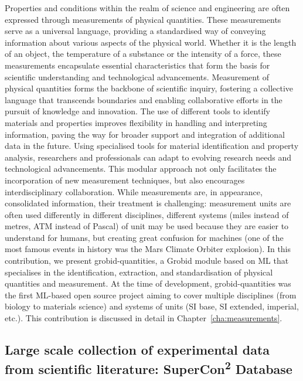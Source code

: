 Properties and conditions within the realm of science and engineering are often expressed through measurements of physical quantities. These measurements serve as a universal language, providing a standardised way of conveying information about various aspects of the physical world. Whether it is the length of an object, the temperature of a substance or the intensity of a force, these measurements encapsulate essential characteristics that form the basis for scientific understanding and technological advancements.
Measurement of physical quantities forms the backbone of scientific inquiry, fostering a collective language that transcends boundaries and enabling collaborative efforts in the pursuit of knowledge and innovation.
The use of different tools to identify materials and properties improves flexibility in handling and interpreting information, paving the way for broader support and integration of additional data in the future. Using specialised tools for material identification and property analysis, researchers and professionals can adapt to evolving research needs and technological advancements. This modular approach not only facilitates the incorporation of new measurement techniques, but also encourages interdisciplinary collaboration.
While measurements are, in appearance, consolidated information, their treatment is challenging: measurement units are often used differently in different disciplines, different systems (miles instead of metres, ATM instead of Pascal) of unit may be used because they are easier to understand for humans, but creating great confusion for machines (one of the most famous events in history was the Mars Climate Orbiter explosion). 
In this contribution, we present grobid-quantities, a Grobid module based on ML that specialises in the identification, extraction, and standardisation of physical quantities and measurement. At the time of development, grobid-quantities was the first ML-based open source project aiming to cover multiple disciplines (from biology to materials science) and systems of units (SI base, SI extended, imperial, etc.). 
This contribution is discussed in detail in Chapter~\ref{cha:measurements}.


\subsection{Large scale collection of experimental data from scientific literature: SuperCon\texorpdfstring{\textsuperscript{2}}{2} Database}
\label{sec:intro-supercon2}

